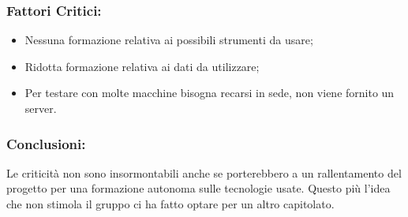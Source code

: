 \subsubsection{Fattori Critici:}
\begin{itemize}
	\item Nessuna formazione relativa ai possibili strumenti da usare;
	\item Ridotta formazione relativa ai dati da utilizzare;
	\item Per testare con molte macchine bisogna recarsi in sede, non viene fornito un server.
\end{itemize}

\subsubsection{Conclusioni:}
Le criticità non sono insormontabili anche se porterebbero a un rallentamento del progetto per una formazione autonoma sulle tecnologie usate.
Questo più l'idea che non stimola il gruppo ci ha fatto optare per un altro capitolato.
